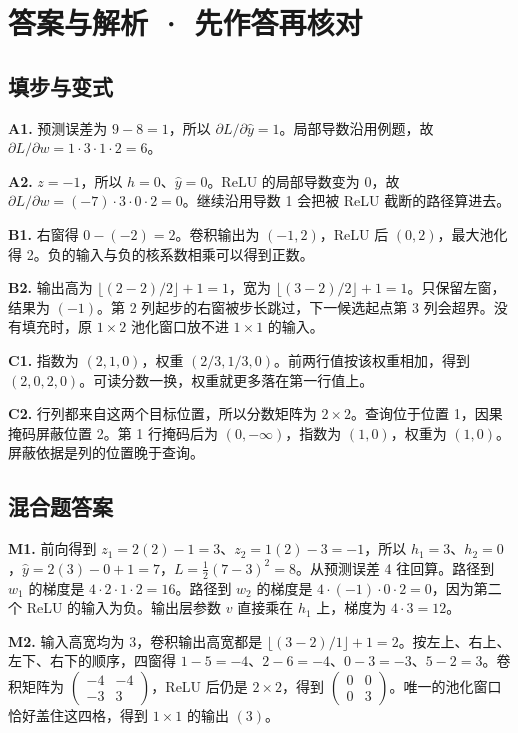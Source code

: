 \documentclass[UTF8,a4paper,11pt]{ctexart}
\begin{document}
\section{答案与解析 · 先作答再核对}
\subsection{填步与变式}
\textbf{A1.} 预测误差为 $9-8=1$，所以 $\partial L/\partial\hat y=1$。局部导数沿用例题，故 $\partial L/\partial w=1\cdot3\cdot1\cdot2=6$。

\textbf{A2.} $z=-1$，所以 $h=0$、$\hat y=0$。ReLU 的局部导数变为 0，故 $\partial L/\partial w=(-7)\cdot3\cdot0\cdot2=0$。继续沿用导数 1 会把被 ReLU 截断的路径算进去。

\textbf{B1.} 右窗得 $0-(-2)=2$。卷积输出为 $(-1,2)$，ReLU 后 $(0,2)$，最大池化得 2。负的输入与负的核系数相乘可以得到正数。

\textbf{B2.} 输出高为 $\lfloor(2-2)/2\rfloor+1=1$，宽为 $\lfloor(3-2)/2\rfloor+1=1$。只保留左窗，结果为 $(-1)$。第 2 列起步的右窗被步长跳过，下一候选起点第 3 列会超界。没有填充时，原 $1\times2$ 池化窗口放不进 $1\times1$ 的输入。

\textbf{C1.} 指数为 $(2,1,0)$，权重 $(2/3,1/3,0)$。前两行值按该权重相加，得到 $(2,0,2,0)$。可读分数一换，权重就更多落在第一行值上。

\textbf{C2.} 行列都来自这两个目标位置，所以分数矩阵为 $2\times2$。查询位于位置 1，因果掩码屏蔽位置 2。第 1 行掩码后为 $(0,-\infty)$，指数为 $(1,0)$，权重为 $(1,0)$。屏蔽依据是列的位置晚于查询。

\clearpage
\subsection{混合题答案}
\textbf{M1.} 前向得到 $z_1=2(2)-1=3$、$z_2=1(2)-3=-1$，所以 $h_1=3$、$h_2=0$，$\hat y=2(3)-0+1=7$，$L=\frac12(7-3)^2=8$。从预测误差 4 往回算。路径到 $w_1$ 的梯度是 $4\cdot2\cdot1\cdot2=16$。路径到 $w_2$ 的梯度是 $4\cdot(-1)\cdot0\cdot2=0$，因为第二个 ReLU 的输入为负。输出层参数 $v$ 直接乘在 $h_1$ 上，梯度为 $4\cdot3=12$。

\textbf{M2.} 输入高宽均为 3，卷积输出高宽都是 $\lfloor(3-2)/1\rfloor+1=2$。按左上、右上、左下、右下的顺序，四窗得 $1-5=-4$、$2-6=-4$、$0-3=-3$、$5-2=3$。卷积矩阵为 $\begin{pmatrix}-4&-4\\-3&3\end{pmatrix}$，ReLU 后仍是 $2\times2$，得到 $\begin{pmatrix}0&0\\0&3\end{pmatrix}$。唯一的池化窗口恰好盖住这四格，得到 $1\times1$ 的输出 $(3)$。
\end{document}
